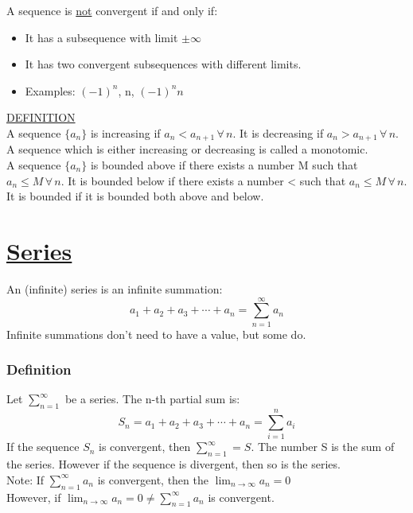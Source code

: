 \documentclass[12pt, letterpaper]{article}
\begin{document}
            A sequence is \underline{not} convergent  if and only if:
            \begin{center}
                \begin{itemize}
                    \item It has a subsequence with limit $\pm \infty$
                    \item It has two convergent subsequences with different limits. 
                    \item Examples: $(-1)^n$, n, $(-1)^n n$
                \end{itemize}
            \end{center}
            \underline{DEFINITION}\\
            A sequence $\{a_n\}$ is increasing if $a_n < a_{n+1} \, \forall \, n$. It is decreasing if $a_n > a_{n+1} \, \forall \, n$. A sequence which is either increasing or decreasing is called a monotomic.\\
            A sequence $\{ a_n \}$ is bounded above if there exists a number M such that $a_n \leq M \, \forall \, n$. It is bounded below if there exists a number < such that $a_n \leq M \, \forall \, n$. It is bounded if it is bounded both above and below.
            
    \section{\underline{Series}}
        An (infinite) series is an infinite summation: $$a_1 + a_2 + a_3 + \cdots + a_n = \sum_{n = 1}^\infty a_n$$
        Infinite summations don't need to have a value, but some do. \\

            \subsubsection*{Definition}
                Let $\sum_{n = 1}^\infty$ be a series. The n-th partial sum is:
                \begin{equation}
                    S_n = a_1 + a_2 + a_3 + \cdots + a_n = \sum_{i=1}^n a_i
                \end{equation}
                If the sequence ${S_n}$ is convergent, then $\sum_{n=1}^\infty = S$. The number S is the sum of the series. However if the sequence is divergent, then so is the series.\\
                Note: If $\sum_{n = 1}^\infty a_n$ is convergent, then the $\lim_{n \to \infty} a_n = 0$\\
                \indent However, if $\lim_{n \to \infty} a_n = 0 \neq \sum_{n = 1}^\infty a_n$ is convergent.
        
\end{document}
